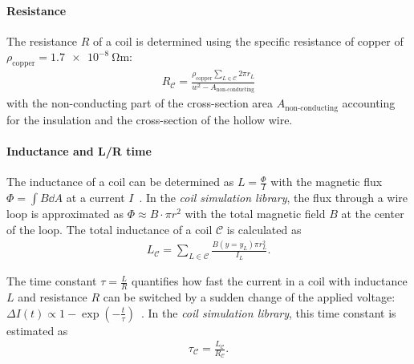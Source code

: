 \paragraph{Resistance}
The resistance $R$ of a coil is determined using the specific resistance of copper of $\rho_\text{copper} = \SI{1.7e-8}{\ohm\meter}$:
\begin{align}\label{eq:resistance_simulation}
    R_\mathcal{C} = \frac{\rho_\text{copper} \sum\limits_{L \in \mathcal{C}} 2\pi r_L} {w^2 - A_\text{non-conducting}}
\end{align}
with the non-conducting part of the cross-section area $A_\text{non-conducting}$ accounting for the insulation and the cross-section of the hollow wire.

\paragraph{Inductance and L/R time} The inductance of a coil can be determined as $L = \frac{\Phi}{I}$ with the magnetic flux $\Phi = \int B \dd A$ at a current $I$~\cite{demtroder_zeitlich_2013}. In the \textit{coil simulation library}, the flux through a wire loop is approximated as $\Phi \approx B \cdot \pi r^2$ with the total magnetic field $B$ at the center of the loop. The total inductance of a coil $\mathcal{C}$ is calculated as
\begin{align}\label{eq:inductance_simulation}
    L_\mathcal{C} = \sum\limits_{L \in \mathcal{C}} \frac{B(y = y_L) \pi r_L^2}{I_L}.
\end{align}

The time constant $\tau = \frac{L}{R}$ quantifies how fast the current in a coil with inductance $L$ and resistance $R$ can be switched by a sudden change of the applied voltage: $\Delta I(t) \propto 1-\exp \left(-\frac{t}{\tau}\right)$~\cite{demtroder_zeitlich_2013}. In the \textit{coil simulation library}, this time constant is estimated as
\begin{align}\label{eq:time_constant_simulation}
    \tau_\mathcal{C} = \frac{L_\mathcal{C}}{R_\mathcal{C}}.
\end{align}

